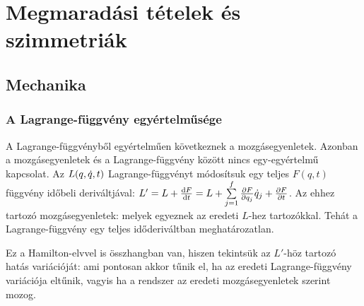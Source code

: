 \chapter{Megmarad\'asi t\'etelek \'es szimmetri\'ak}\label{ss:A04}
 
 \section{Mechanika}
  
   
  \subsection{A Lagrange-függvény egyértelműsége}
   
   A Lagrange-függvényből egyértelműen következnek a mozgásegyenletek. Azonban a mozgásegyenletek és a Lagrange-függvény között nincs egy-egyértelmű kapcsolat. Az $L(q,\dot{q},t)$ Lagrange-függvényt módosítsuk egy teljes  $F(q,t)$ függvény időbeli deriváltjával: $L'=L+\frac{\mathrm{d} F}{\mathrm{d} t}=L+\sum\limits_{j=1}^{f}\frac{\partial F}{\partial q_j}\dot{q}_j+\frac{\partial F}{\partial t}$. Az ehhez tartozó mozgásegyenletek:
   melyek egyeznek az eredeti $L$-hez tartozókkal. Tehát a Lagrange-függvény egy teljes időderiváltban meghatározatlan.
   
   Ez a Hamilton-elvvel is összhangban van, hiszen tekintsük az $L'$-höz tartozó hatás variációját:
   ami pontosan akkor tűnik el, ha az eredeti Lagrange-függvény variációja eltűnik, vagyis ha a rendszer az eredeti mozgásegyenletek szerint mozog.
   
